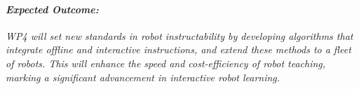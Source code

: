 \documentclass{erc-B2}
\begin{document}
\begin{enumerate}

\end{enumerate}
\paragraph{\textit{Expected Outcome:}} \textit{WP4 will set new standards in robot instructability by developing algorithms that integrate offline and interactive instructions, and extend these methods to a fleet of robots. This will enhance the speed and cost-efficiency of robot teaching, marking a significant advancement in interactive robot learning.}

\end{document}
